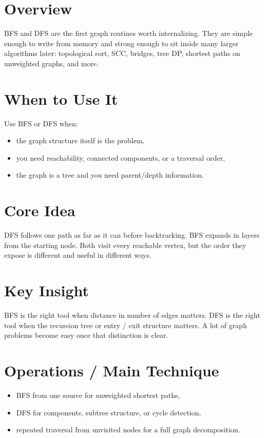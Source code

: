 \section*{Overview}

BFS and DFS are the first graph routines worth internalizing. They are simple enough to write from memory and strong
enough to sit inside many larger algorithms later: topological sort, SCC, bridges, tree DP, shortest paths on
unweighted graphs, and more.

\section*{When to Use It}

Use BFS or DFS when:

\begin{itemize}
  \item the graph structure itself is the problem,
  \item you need reachability, connected components, or a traversal order,
  \item the graph is a tree and you need parent/depth information.
\end{itemize}

\section*{Core Idea}

DFS follows one path as far as it can before backtracking. BFS expands in layers from the starting node. Both visit
every reachable vertex, but the order they expose is different and useful in different ways.

\section*{Key Insight}

BFS is the right tool when distance in number of edges matters. DFS is the right tool when the recursion tree or entry /
exit structure matters. A lot of graph problems become easy once that distinction is clear.

\section*{Operations / Main Technique}

\begin{itemize}
  \item BFS from one source for unweighted shortest paths,
  \item DFS for components, subtree structure, or cycle detection,
  \item repeated traversal from unvisited nodes for a full graph decomposition.
\end{itemize}

